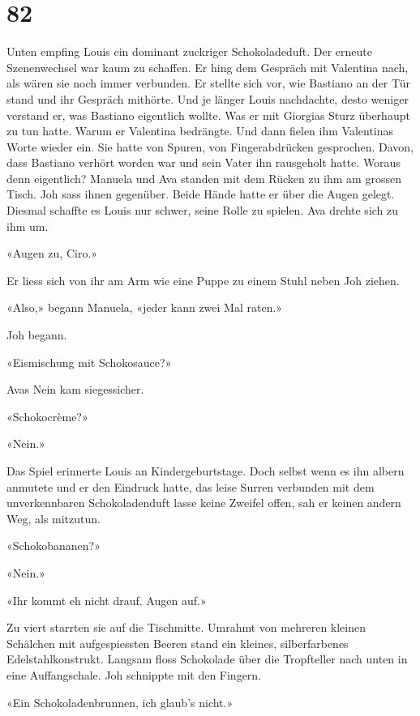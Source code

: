 \chapter{82}



Unten empfing Louis ein dominant zuckriger Schokoladeduft. Der
erneute Szenenwechsel war kaum zu schaffen. Er hing dem Gespräch mit
Valentina nach, als wären sie noch immer verbunden. Er stellte sich vor, wie Bastiano an der Tür stand und ihr Gespräch
mithörte. Und je länger Louis nachdachte, desto weniger verstand
er, was Bastiano eigentlich wollte. Was er mit Giorgias Sturz überhaupt
zu tun hatte. Warum er Valentina bedrängte. Und dann fielen ihm
Valentinas Worte wieder ein. Sie hatte von Spuren, von Fingerabdrücken
gesprochen. Davon, dass Bastiano verhört worden war und sein Vater ihn
rausgeholt hatte. Woraus denn eigentlich?
Manuela und Ava standen mit dem Rücken zu ihm am grossen Tisch. Joh sass
ihnen gegenüber. Beide Hände hatte er über die Augen gelegt. Diesmal
schaffte es Louis nur schwer, seine Rolle zu spielen. 
Ava drehte sich zu ihm um.

«Augen zu, Ciro.»

Er liess sich von ihr am Arm wie eine Puppe zu einem Stuhl neben Joh
ziehen.

«Also,» begann Manuela, «jeder kann zwei Mal raten.»

Joh begann.

«Eismischung mit Schokosauce?»

Avas Nein kam siegessicher.

«Schokocrème?»

«Nein.»

Das Spiel erinnerte Louis an Kindergeburtstage. Doch selbst wenn es ihn albern anmutete und er den Eindruck hatte, das leise Surren verbunden mit dem unverkennbaren Schokoladenduft lasse keine Zweifel offen, sah er keinen andern Weg, als mitzutun.

«Schokobananen?»

«Nein.»

«Ihr kommt eh nicht drauf. Augen auf.»

Zu viert starrten sie auf die Tischmitte. Umrahmt von mehreren kleinen
Schälchen mit aufgespiessten Beeren stand ein kleines, silberfarbenes
Edelstahlkonstrukt. Langsam floss Schokolade über die Tropfteller nach
unten in eine Auffangschale.
Joh schnippte mit den Fingern.

«Ein Schokoladenbrunnen, ich glaub’s nicht.»

